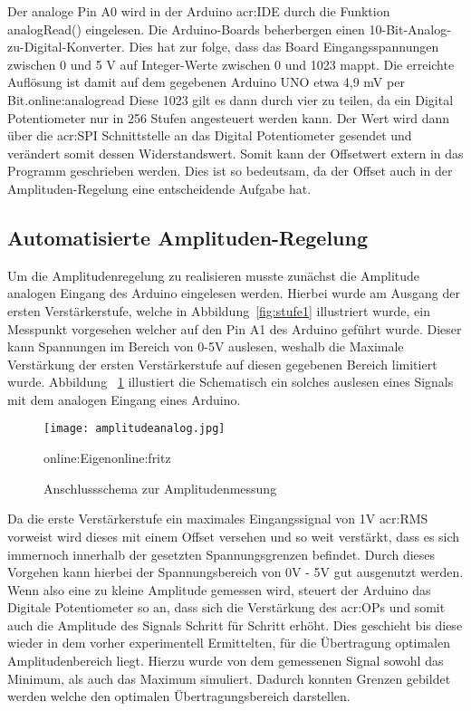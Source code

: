 Der analoge Pin A0 wird in der Arduino \gls{acr:IDE} durch die Funktion analogRead() eingelesen. Die Arduino-Boards beherbergen einen 10-Bit-Analog-zu-Digital-Konverter. Dies hat zur folge, dass das Board Eingangsspannungen zwischen 0 und 5 V auf Integer-Werte zwischen 0 und 1023 mappt. Die erreichte Auflösung ist damit auf dem gegebenen Arduino UNO etwa 4,9 mV per Bit.\gls{online:analogread} Diese 1023 gilt es dann durch vier zu teilen, da ein Digital Potentiometer nur in 256 Stufen angesteuert werden kann. Der Wert wird dann über die \gls{acr:SPI} Schnittstelle an das Digital Potentiometer gesendet und verändert somit dessen Widerstandswert. Somit kann der Offsetwert extern in das Programm geschrieben werden. Dies ist so bedeutsam, da der Offset auch in der Amplituden-Regelung eine entscheidende Aufgabe hat. 
\newpage
\subsection{Automatisierte Amplituden-Regelung}
\label{subsec:autoamp}

Um die Amplitudenregelung zu realisieren musste zunächst die Amplitude analogen Eingang des Arduino eingelesen werden. Hierbei wurde am Ausgang der ersten Verstärkerstufe, welche in Abbildung~\ref{fig:stufe1} illustriert wurde, ein Messpunkt vorgesehen welcher auf den Pin A1 des Arduino geführt wurde. Dieser kann Spannungen im Bereich von 0-5V auslesen, weshalb die Maximale Verstärkung der ersten Verstärkerstufe auf diesen gegebenen Bereich limitiert wurde. Abbildung ~\ref{fig:amplitudeanalog} illustiert die Schematisch ein solches auslesen eines Signals mit dem analogen Eingang eines Arduino. 

\begin{figure}[H]
	\centering
	\texttt{[image: amplitudeanalog.jpg]}
	\caption[Anschlussschema zur Amplitudenmessung]{Anschlussschema zur Amplitudenmessung} 
	\gls{online:Eigen}\gls{online:fritz}
	\label{fig:amplitudeanalog}
\end{figure}

Da die erste Verstärkerstufe ein maximales Eingangssignal von 1V \gls{acr:RMS} vorweist wird dieses mit einem Offset versehen und so weit verstärkt, dass es sich immernoch innerhalb der gesetzten Spannungsgrenzen befindet. Durch dieses Vorgehen kann hierbei der Spannungsbereich von 0V - 5V gut ausgenutzt werden. Wenn also eine zu kleine Amplitude gemessen wird, steuert der Arduino das Digitale Potentiometer so an, dass sich die Verstärkung des \gls{acr:OP}s und somit auch die Amplitude des Signals Schritt für Schritt erhöht. Dies geschieht bis diese wieder in dem vorher experimentell Ermittelten, für die Übertragung optimalen Amplitudenbereich liegt. Hierzu wurde von dem gemessenen Signal sowohl das Minimum, als auch das Maximum simuliert. Dadurch konnten Grenzen gebildet werden welche den optimalen Übertragungsbereich darstellen. 




